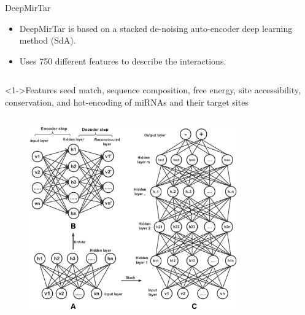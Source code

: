 \documentclass{beamer}
\begin{document}
\begin{frame}{DeepMirTar}
\begin{itemize}
\item DeepMirTar is based on a stacked de-noising auto-encoder deep learning method (SdA).
\item Uses 750 different features to describe the interactions.
\end{itemize}
\begin{column}{0.5\textwidth}
\begin{exampleblock}
		<1->{Features}
seed match, sequence composition, free energy, site accessibility, conservation, and hot-encoding of miRNAs and their target sites
\end{exampleblock}
\end{column}
\begin{column}{0.5\textwidth}
\begin{figure}[]
	  \centering
\includegraphics[width=0.8\textwidth,keepaspectratio]{images/deepmirtarsda.png}
\end{figure}
\end{column}
\end{frame}
\end{document}
